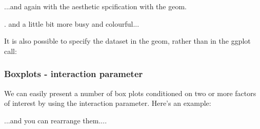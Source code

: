 \documentclass[titlepage]{book}\usepackage{knitr}
\begin{document}
...and again with the aesthetic spcification with the geom.
\begin{knitrout}
\color{fgcolor}\begin{kframe}
\begin{alltt}
 \hlkwb{<-}  \hlopt{+}
      \hlstd{(}\hlstd{(}      
\end{alltt}
\end{kframe}
\end{knitrout}

. and a little bit more busy and colourful...

\begin{knitrout}
\color{fgcolor}\begin{kframe}
\begin{alltt}
 \hlkwb{<-}  \hlstd{(}       \hlopt{+} \hlstd{()}
\end{alltt}
\end{kframe}
\end{knitrout}
It is also possible to specify the dataset in the geom, rather than in the ggplot call:

\begin{knitrout}
\color{fgcolor}\begin{kframe}
\begin{alltt}
 \hlkwb{<-} \hlstd{()} \hlopt{+}
  \hlstd{(}  \hlstd{(}      
\end{alltt}
\end{kframe}
\end{knitrout}

\subsubsection{Boxplots - interaction parameter}  
We can easily present a number of box plots conditioned on two or more factors of interest by using the interaction parameter. Here's an example:
\begin{knitrout}
\color{fgcolor}\begin{kframe}
\begin{alltt}
 \hlkwb{<-} \hlstd{(}  \hlstd{(} \hlstd{=}  
 \hlkwb{<-}  \hlopt{+} \hlstd{(} \hlstd{=} \hlstd{)}
\end{alltt}
\end{kframe}
\end{knitrout}
...and you can rearrange them....
\end{document}
